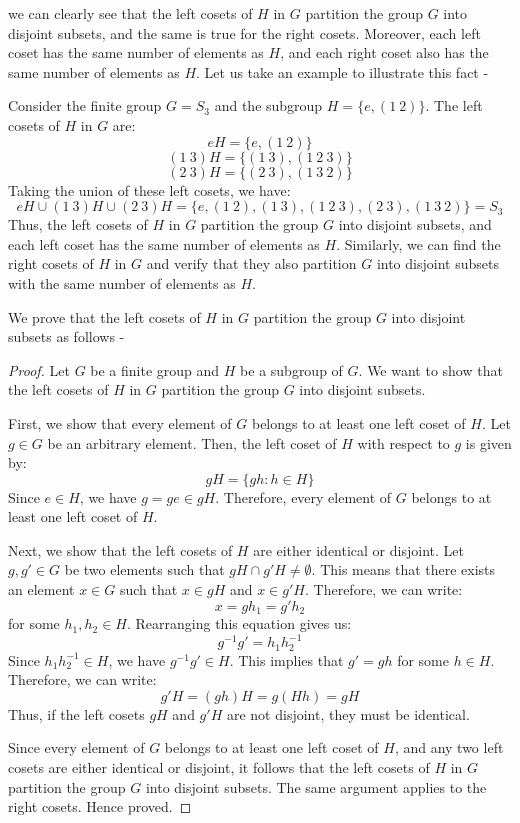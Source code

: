 \documentclass[openany]{book}
\begin{document}
we can clearly see that the left cosets of \( H \) in \( G \) partition the group \( G \) into disjoint subsets, and the same is true for the right cosets. Moreover, each left coset has the same number of elements as \( H \), and each right coset also has the same number of elements as \( H \).
Let us take an example to illustrate this fact - \\
\begin{example}
Consider the finite group \( G = S_3 \) and the subgroup \( H = \{ e, (1\ 2) \} \). The left cosets of \( H \) in \( G \) are:
\[eH = \{ e, (1\ 2) \}\]
\[(1\ 3)H = \{ (1\ 3), (1\ 2\ 3) \}\]
\[(2\ 3)H = \{ (2\ 3), (1\ 3\ 2) \}\]
Taking the union of these left cosets, we have:
\[eH \cup (1\ 3)H \cup (2\ 3)H = \{ e, (1\ 2), (1\ 3), (1\ 2\ 3), (2\ 3), (1\ 3\ 2) \} = S_3\]
Thus, the left cosets of \( H \) in \( G \) partition the group \( G \) into disjoint subsets, and each left coset has the same number of elements as \( H \). Similarly, we can find the right cosets of \( H \) in \( G \) and verify that they also partition \( G \) into disjoint subsets with the same number of elements as \( H \).
\end{example}
We prove that the left cosets of \( H \) in \( G \) partition the group \( G \) into disjoint subsets as follows -
\begin{proof}
    Let \( G \) be a finite group and \( H \) be a subgroup of \( G \). We want to show that the left cosets of \( H \) in \( G \) partition the group \( G \) into disjoint subsets. 

    First, we show that every element of \( G \) belongs to at least one left coset of \( H \). Let \( g \in G \) be an arbitrary element. Then, the left coset of \( H \) with respect to \( g \) is given by:
    \[
    gH = \{ gh : h \in H \}
    \]
    Since \( e \in H \), we have \( g = ge \in gH \). Therefore, every element of \( G \) belongs to at least one left coset of \( H \).

    Next, we show that the left cosets of \( H \) are either identical or disjoint. Let \( g, g' \in G \) be two elements such that \( gH \cap g'H \neq \emptyset \). This means that there exists an element \( x \in G \) such that \( x \in gH \) and \( x \in g'H \). Therefore, we can write:
    \[
    x = gh_1 = g'h_2
    \]
    for some \( h_1, h_2 \in H \). Rearranging this equation gives us:
    \[
    g^{-1}g' = h_1 h_2^{-1}
    \]
    Since \( h_1 h_2^{-1} \in H \), we have \( g^{-1}g' \in H \). This implies that \( g' = gh \) for some \( h \in H \). Therefore, we can write:
    \[
    g'H = (gh)H = g(Hh) = gH
    \]
    Thus, if the left cosets \( gH \) and \( g'H \) are not disjoint, they must be identical.

    Since every element of \( G \) belongs to at least one left coset of \( H \), and any two left cosets are either identical or disjoint, it follows that the left cosets of \( H \) in \( G \) partition the group \( G \) into disjoint subsets. The same argument applies to the right cosets. Hence proved.
\end{proof}
\end{document}
